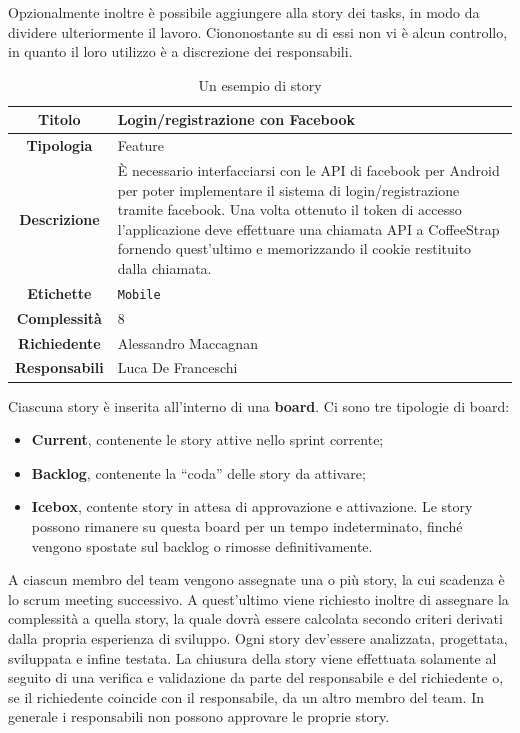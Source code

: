 Opzionalmente inoltre è possibile aggiungere alla story dei tasks, in modo da dividere ulteriormente il lavoro. Ciononostante su di essi non vi è alcun controllo, in quanto il loro utilizzo è a discrezione dei responsabili.

\begin{center}
\begin{table}[htpd]
  \begin{tabularx}{\textwidth}{ | c | X |}
    \hline
    \textbf{Titolo} & Login/registrazione con Facebook \\
    \hline
    \textbf{Tipologia} & Feature \\
    \hline
    \textbf{Descrizione} & È necessario interfacciarsi con le API di facebook per Android per poter implementare il sistema di login/registrazione tramite facebook. Una volta ottenuto il token di accesso l'applicazione deve effettuare una chiamata API a CoffeeStrap fornendo quest'ultimo e memorizzando il cookie restituito dalla chiamata. \\
    \hline
    \textbf{Etichette} & \texttt{Mobile} \\
    \hline
    \textbf{Complessità} & 8 \\
    \hline
    \textbf{Richiedente} & Alessandro Maccagnan \\
    \hline
    \textbf{Responsabili} & Luca De Franceschi \\
    \hline
  \end{tabularx}
  \caption{Un esempio di story}
 \end{table}
\end{center}

Ciascuna story è inserita all'interno di una \textbf{board}. Ci sono tre tipologie di board:

\begin{itemize}

\item \textbf{Current}, contenente le story attive nello sprint corrente;
\item \textbf{Backlog}, contenente la ``coda'' delle story da attivare;
\item \textbf{Icebox}, contente story in attesa di approvazione e attivazione. Le story possono rimanere su questa board per un tempo indeterminato, finché vengono spostate sul backlog o rimosse definitivamente.

\end{itemize} 

A ciascun membro del team vengono assegnate una o più story, la cui scadenza è lo scrum meeting successivo. A quest'ultimo viene richiesto inoltre di assegnare la complessità a quella story, la quale dovrà essere calcolata secondo criteri derivati dalla propria esperienza di sviluppo. Ogni story dev'essere analizzata, progettata, sviluppata e infine testata. La chiusura della story viene effettuata solamente al seguito di una verifica e validazione da parte del responsabile e del richiedente o, se il richiedente coincide con il responsabile, da un altro membro del team. In generale i responsabili non possono approvare le proprie story.


